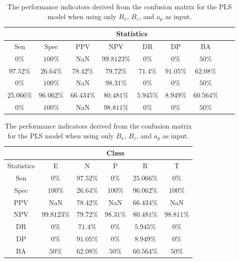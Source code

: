 \begin{table}[!ht]
	\centering
	\begin{tabular}{|c|c|c|c|c|c|c|c|c|}
		\hline
		 & \multicolumn{7}{c|}{Statistics} \\ \hline
		Sen & Spec & PPV & NPV & DR & DP & BA \\ \hline
		$0\%$ & $100\%$ & NaN & $99.8123\%$ & $0\%$ & $0\%$ & $50\%$ \\ \hline
		$97.52\%$ & $26.64\%$ & $78.42\%$ & $79.72\%$ & $71.4\%$ & $91.05\%$ & $62.08\%$ \\ \hline
		$0\%$ & $100\%$ & NaN & $98.31\%$ & $0\%$ & $0\%$ & $50\%$ \\ \hline
		$25.066\%$ & $96.062\%$ & $66.434\%$ & $80.481\%$ & $5.945\%$ & $8.949\%$ & $60.564\%$ \\ \hline
		$0\%$ & $100\%$ & NaN & $98.811\%$ & $0\%$ & $0\%$ & $50\%$ \\ \hline
	\end{tabular}
	\caption{The performance indicators derived from the confusion matrix for the PLS model when using only $B_{x}$, $B_{z}$, and $a_{p}$ as input.}
	\label{tab:cs:xzap:pls}
\end{table}

\begin{table}[!ht]
	\centering
	\begin{tabular}{|c|c|c|c|c|c|}
		\hline
		 & \multicolumn{5}{c|}{Class} \\ \hline
		Statistics & E & N & P & R & T \\ \hline
		Sen & $0\%$ & $97.52\%$ & $0\%$ & $25.066\%$ & $0\%$ \\ \hline
		Spec & $100\%$ & $26.64\%$ & $100\%$ & $96.062\%$ & $100\%$ \\ \hline
		PPV & NaN & $78.42\%$ & NaN & $66.434\%$ & NaN \\ \hline
		NPV & $99.8123\%$ & $79.72\%$ & $98.31\%$ & $80.481\%$ & $98.811\%$ \\ \hline
		DR & $0\%$ & $71.4\%$ & $0\%$ & $5.945\%$ & $0\%$ \\ \hline
		DP & $0\%$ & $91.05\%$ & $0\%$ & $8.949\%$ & $0\%$ \\ \hline
		BA & $50\%$ & $62.08\%$ & $50\%$ & $60.564\%$ & $50\%$ \\ \hline
	\end{tabular}
	\caption{The performance indicators derived from the confusion matrix for the PLS model when using only $B_{x}$, $B_{z}$, and $a_{p}$ as input.}
	\label{tab:cs:reverse:xzap:pls}
\end{table}

